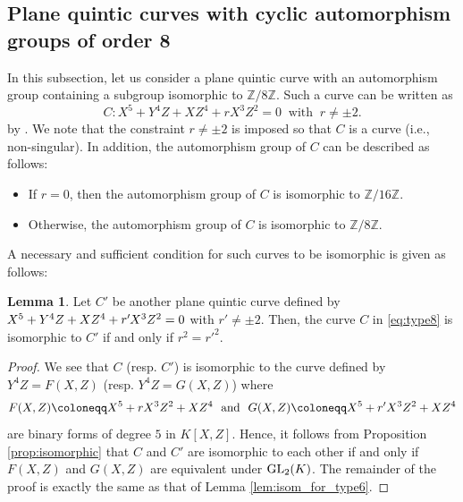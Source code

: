 \documentclass{article}
\theoremstyle{definition}
\newtheorem{Lem}[Def]{Lemma}
\begin{document}
\subsection{Plane quintic curves with cyclic automorphism groups of order 8}\label{subsec:type8}
In this subsection, let us consider a plane quintic curve with an automorphism group containing a subgroup isomorphic to $\mathbb{Z}/8\mathbb{Z}$.
Such a curve can be written as\vspace{-1.2mm}
\begin{equation}\label{eq:type8}
    C: X^5+Y^4Z+XZ^4+rX^3Z^2 = 0 \ \text{ with }\ r \neq \pm 2.
\end{equation}
by \cite[Corollary 7]{BB}.
We note that the constraint $r \neq \pm 2$ is imposed so that $C$ is a curve (i.e., non-singular).
In addition, the automorphism group of $C$ can be described as follows:\vspace{-0.8mm}
\begin{itemize}
    \item If $r = 0$, then the automorphism group of $C$ is isomorphic to $\mathbb{Z}/16\mathbb{Z}$.\vspace{-2.6mm}
    \item Otherwise, the automorphism group of $C$ is isomorphic to $\mathbb{Z}/8\mathbb{Z}$.
\end{itemize}
A necessary and sufficient condition for such curves to be isomorphic is given as follows:\vspace{-1.2mm}
\begin{Lem}\label{lem:isom_for_type8}
Let $C'$ be another plane quintic curve defined by $\hspace{-0.2mm}X^5+Y^4Z+XZ^4+r'\hspace{-0.2mm}X^3Z^2 = 0$ with $r' \neq \pm 2$.
Then, the curve $C$ in \eqref{eq:type8} is isomorphic to $C'$ if and only if $r^2 = r'^2$.\vspace{-1mm}
\end{Lem}
\begin{proof}
We see that $C$ (resp. $C'$) is isomorphic to the curve defined by $Y^4Z = F(X,Z)$ (resp. $Y^4Z = G(X,Z)$) where\vspace{-1mm}
\[
    F(X,Z) \coloneqq X^5+rX^3Z^2+XZ^4 \ \text{ and }\ G(X,Z) \coloneqq X^5+r'X^3Z^2+XZ^4\vspace{0.9mm}
\]
are binary forms of degree $5$ in $K[X,Z]$.
Hence, it follows from Proposition \ref{prop:isomorphic} that $C$ and $C'$ are isomorphic to each other if and only if $F(X,Z)$ and $G(X,Z)$ are equivalent under ${\rm GL}_2(K)$.
The remainder of the proof is exactly the same as that of Lemma \ref{lem:isom_for_type6}.
\end{proof}
\end{document}
